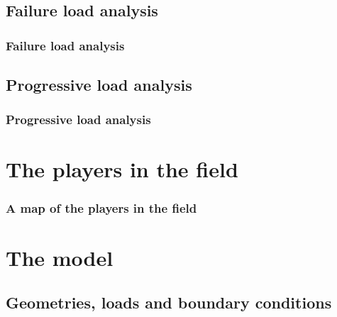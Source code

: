 \documentclass[first,firstsupp,lastsupp,handout,last,hyperref,table]{ETHclass}
\begin{document}
\subsection{Failure load analysis}

\begin{frame}
\frametitle{Failure load analysis}
\vspace{-0.75cm}
\centering
\begin{figure}
\centering

\label{fig:failure_load_analysis}
\end{figure}
\centering

\end{frame}

\subsection{Progressive load analysis}

\begin{frame}
\frametitle{Progressive load analysis}
\vspace{-0.75cm}
\centering
\begin{figure}
\centering

\label{fig:progressive_load_analysis}
\end{figure}
\centering

\end{frame}

\section{The players in the field}

\begin{frame}
\frametitle{A map of the players in the field}
\centering
\href{https://www.google.com/maps/d/edit?hl=en_US&app=mp&mid=zjFSmgZ1fbJQ.kbBAPW9bg6t4}{}
\end{frame}

\section{The model}

\subsection{Geometries, loads and boundary conditions}
\end{document}
